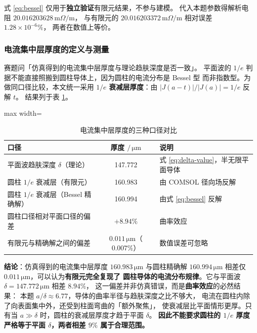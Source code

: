 \documentclass[12pt, a4paper]{ctexart}
\newcommand{\U}[1]{\ensuremath{\,\mathrm{#1}}}
\newcommand{\Uohm}{\ensuremath{\,\mathrm{m}\Omega/\mathrm{m}}}%
\begin{document}
式 \eqref{eq:bessel} 仅用于\textbf{独立验证}有限元结果，不参与建模。
代入本题参数得解析电阻 $20.016203628\Uohm$，
与有限元的 $20.016203372\Uohm$ 相对误差 $1.28\times10^{-6}\%$，
两者在数值上等价。

\subsubsection{电流集中层厚度的定义与测量}

赛题问「仿真得到的电流集中层厚度与理论趋肤深度是否一致」。
平面波的 $1/e$ 判据不能直接照搬到圆柱导体上，因为圆柱的电流分布是 Bessel 型
而非指数型。为做同口径比较，本文统一采用
\textbf{$1/e$ 衰减层厚度}：由 $|J(a-t)|/|J(a)| = 1/e$ 反解 $t$。
结果列于表 \ref{tab:q1-skin}。

\begin{table}[H]
\centering
\caption{电流集中层厚度的三种口径对比}
\label{tab:q1-skin}
\small
\begin{adjustbox}{max width=\textwidth}
\begin{tabular}{l c l}
\toprule
\textbf{口径} & \textbf{厚度} $/\U{\mu m}$ & \textbf{说明} \\
\midrule
平面波趋肤深度 $\delta$（理论）        & 147.772 & 式 \eqref{eq:delta-value}，半无限平面导体 \\
圆柱 $1/e$ 衰减层（有限元）            & 160.983 & 由 COMSOL 径向场反解 \\
圆柱 $1/e$ 衰减层（Bessel 精确解）     & 160.994 & 由式 \eqref{eq:bessel} 反解 \\
\midrule
圆柱口径相对平面口径的偏差             & $+8.94\%$ & 曲率效应 \\
有限元与精确解之间的偏差               & $0.011\U{\mu m}$（$0.007\%$） & 数值误差可忽略 \\
\bottomrule
\end{tabular}
\end{adjustbox}
\end{table}

\textbf{结论}：仿真得到的电流集中层厚度 $160.983\U{\mu m}$ 与圆柱精确解
$160.994\U{\mu m}$ 相差仅 $0.011\U{\mu m}$，可以认为\textbf{有限元完全复现了
圆柱导体的电流分布规律}。它与平面波 $\delta = 147.772\U{\mu m}$ 相差 $8.94\%$，
这一偏差并非仿真错误，而是\textbf{曲率效应}的必然结果：
本题 $a/\delta \approx 6.77$，导体的曲率半径与趋肤深度之比不够大，
电流在圆柱内除了向表面集中外，还受到柱面弯曲的「额外聚焦」，
使衰减层比平面情形更厚。只有当 $a \gg \delta$ 时，圆柱的衰减层厚度才趋于平面 $\delta$。
\textbf{因此不能要求圆柱的 $1/e$ 厚度严格等于平面 $\delta$，两者相差 $9\%$ 属于合理范围。}
\end{document}
